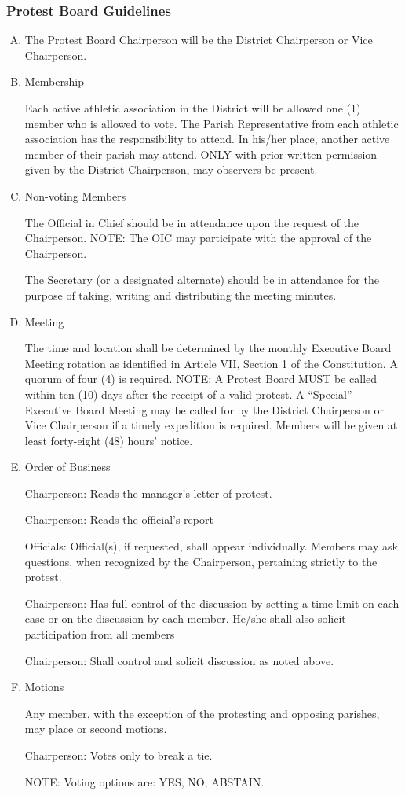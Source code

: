 \subsubsection{Protest Board Guidelines}
\begin{enumerate}[A.]
    \item The Protest Board Chairperson will be the District Chairperson or Vice Chairperson.
    \item Membership

    Each active athletic association in the District will be allowed one (1) member who is allowed to vote.  The Parish Representative from each athletic association has the responsibility to attend.  In his/her place, another active member of their parish may attend.  ONLY with prior written permission given by the District Chairperson, may observers be present.
    \item Non-voting Members 

	The Official in Chief should be in attendance upon the request of the Chairperson.  NOTE:  The OIC may participate with the approval of the Chairperson. 

	The Secretary (or a designated alternate) should be in attendance for the purpose of taking, writing and distributing the meeting minutes.  
    \item Meeting   

	The time and location shall be determined by the monthly Executive Board Meeting rotation as identified in Article VII, Section 1 of the Constitution.  A quorum of four (4) is required.  NOTE:  A Protest Board MUST be called within ten (10) days after the receipt of a valid protest.  A “Special” Executive Board Meeting may be called for by the District Chairperson or Vice Chairperson if a timely expedition is required. Members will be given at least forty-eight (48) hours’ notice.

    \item Order of Business
	
       Chairperson:
       Reads the manager's letter of protest.
	
	Chairperson:
       Reads the official's report

       Officials:  
       Official(s), if requested, shall appear individually.  Members may ask questions, when recognized by the 
       Chairperson, pertaining strictly to the protest.

	Chairperson:
       Has full control of the discussion by setting a time limit on each case or on the discussion by each member. 
       He/she shall also solicit participation from all members

	Chairperson:  
       Shall control and solicit discussion as noted above.

    \item Motions

    Any member, with the exception of the protesting and opposing parishes, may place or second motions.

    Chairperson:  Votes only to break a tie.
    
    NOTE:  Voting options are:  YES, NO, ABSTAIN.
\end{enumerate}

